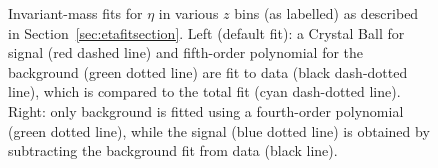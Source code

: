 \begin{figure}[H]
\label{fig:etazfit}
\caption[Invariant-mass fits for $\eta$ in various $z$ bins]{Invariant-mass fits for $\eta$ in various $z$ bins (as labelled) as described in Section~\ref{sec:etafitsection}. Left (default fit):  a Crystal Ball for signal (red dashed line) and fifth-order polynomial for the background (green dotted line) are fit to data (black dash-dotted line), which is compared to the total fit  (cyan dash-dotted line). Right: only background is fitted using a fourth-order polynomial (green dotted line), while the signal (blue dotted line) is obtained by subtracting the background fit from data (black line).}
\end{figure}
